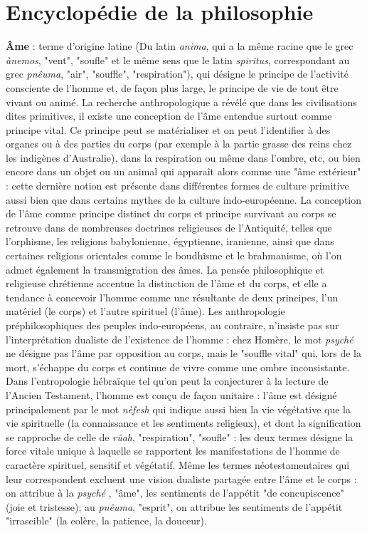 
\section{Encyclopédie de la philosophie}

{\bf Âme} : terme d'origine latine (Du latin {\it anima}, qui a la même racine que le grec {\it ànemos}, "vent", "soufle" et le même sens que le latin {\it spiritus}, correspondant au grec {\it pnêuma}, "air", "souffle", "respiration"), qui désigne le principe de l'activité consciente de l'homme et, de façon plus large, le principe de vie de tout être vivant ou animé. La recherche anthropologique a révélé que dans les civilisations dites primitives, il existe une conception de l'âme entendue surtout comme principe vital. Ce principe peut se matérialiser et on peut l'identifier à des organes ou à des parties du corps (par exemple à la partie grasse des reins chez les indigènes d'Australie), dans la respiration ou même dans l'ombre, etc, ou bien encore dans un objet ou un animal qui apparaît alors comme une "âme extérieur" : cette dernière notion est présente dans différentes formes de culture primitive aussi bien que dans certains mythes de la culture indo-européenne. La conception de l'âme comme principe distinct du corps et principe survivant au corps se retrouve dans de nombreuses doctrines religieuses de l'Antiquité, telles que l'orphisme, les religions babylonienne, égyptienne, iranienne, ainsi que dans certaines religions orientales comme le boudhisme et le brahmanisme, où l'on admet également la transmigration des âmes. La pensée philosophique et religieuse chrétienne accentue la distinction de l'âme et du corps, et elle a tendance à concevoir l'homme comme une résultante de deux principes, l'un matériel (le corps) et l'autre spirituel (l'âme). Les anthropologie préphilosophiques des peuples indo-européens, au contraire, n'insiste pas sur l'interprétation dualiste de l'existence de l'homme : chez Homère, le mot {\it psyché} ne désigne pas l'âme par opposition au corps, mais le "souffle vital" qui, lors de la mort, s'échappe du corps et continue de vivre comme une ombre inconsistante. Dans l'entropologie hébraïque tel qu'on peut la conjecturer à la lecture de l'Ancien Testament, l'homme est conçu de façon unitaire : l'âme est désigné principalement par le mot {\it nèfesh} qui indique aussi bien la vie végétative que la vie spirituelle (la connaissance et les sentiments religieux), et dont la signification se rapproche de celle de {\it rûah}, "respiration", "soufle" : les deux termes désigne la force vitale unique à laquelle se rapportent les manifestations de l'homme de caractère spirituel, sensitif et végétatif. Même les termes néotestamentaires qui leur correspondent excluent une vision dualiste partagée entre l'âme et le corps : on attribue à la {\it psyché} , "âme", les sentiments de l'appétit "de concupiscence" (joie et tristesse); au {\it pnêuma}, "esprit", on attribue les sentiments de l'appétit "irrascible" (la colère, la patience, la douceur).

